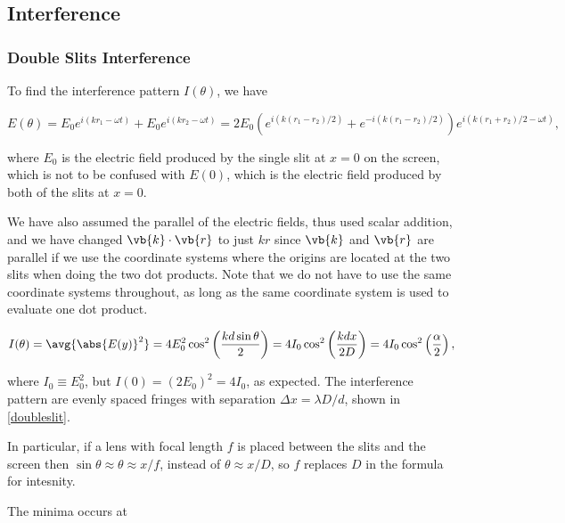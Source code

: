 \documentclass[english,a4paper,12pt]{report}
\begin{document}

\subsection{Interference}

\subsubsection{Double Slits Interference}

To find the interference pattern \(I(\theta )\), we have

\begin{equation}
    E(\theta ) = E_0 e^{i(kr_1 - \omega t)} + E_0 e^{i(kr_2 - \omega t)} = 2E_0 \left( e^{i(k(r_1 -r_2 )/2)} + e^{-i(k(r_1 -r_2 )/2)}    \right) e^{i (k(r_1 +r_2 ) /2- \omega t)},   
\end{equation}

where \(E_0 \) is the electric field produced by the single slit at \(x=0\) on the screen, which is not to be confused with \(E(0)\), which is the electric field produced by both of the slits at \(x = 0\).

We have also assumed the parallel of the electric fields, thus used scalar addition, and we have changed \(\vb{k} \cdot \vb{r} \) to just \(kr\) since \(\vb{k} \) and \(\vb{r} \) are parallel if we use the coordinate systems where the origins are located at the two slits when doing the two dot products. Note that we do not have to use the same coordinate systems throughout, as long as the same coordinate system is used to evaluate one dot product.

\begin{equation}
    I(\theta ) = \avg{\abs{E(y)}^2 } = 4 E_0 ^2\cos ^2\left( \frac{kd \sin \theta }{2}  \right) = 4I_0 \cos ^2\left( \frac{kdx}{2D}  \right) = 4I_0 \cos ^2\left( \frac{\alpha }{2}  \right),
\end{equation}

where \(I_0 \equiv  E_0 ^2\), but \(I(0) = (2E_0 )^2 = 4I_0 \), as expected. The interference pattern are evenly spaced fringes with separation \(\Delta x = \lambda D /d\), shown in \cref{doubleslit}. 

In particular, if a lens with focal length \(f\) is placed between the slits and the screen then \(\sin \theta \approx \theta \approx x/f\), instead of \(\theta \approx x/D\), so \(f\) replaces \(D\) in the formula for intesnity. 

The minima occurs at 
\end{document}
